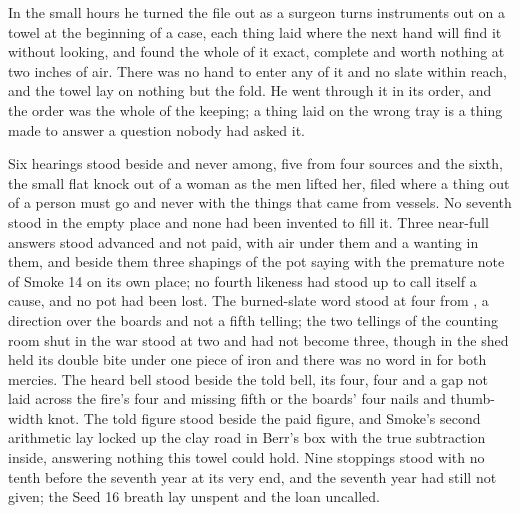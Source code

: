 \scenebreak

In the small hours he turned the file out as a surgeon turns instruments out on a towel at the beginning of a case, each thing laid where the next hand will find it without looking, and found the whole of it exact, complete and worth nothing at two inches of air. There was no hand to enter any of it and no slate within reach, and the towel lay on nothing but the fold. He went through it in its order, and the order was the whole of the keeping; a thing laid on the wrong tray is a thing made to answer a question nobody had asked it.

Six hearings stood beside and never among, five from four sources and the sixth, the small flat knock out of a woman as the men lifted her, filed where a thing out of a person must go and never with the things that came from vessels. No seventh stood in the empty place and none had been invented to fill it. Three near-full answers stood advanced and not paid, with air under them and a wanting in them, and beside them three shapings of the pot saying with the premature note of Smoke 14 on its own place; no fourth likeness had stood up to call itself a cause, and no pot had been lost. The burned-slate word stood at four from , a direction over the boards and not a fifth telling; the two tellings of the counting room shut in the war stood at two and had not become three, though  in the shed held its double bite under one piece of iron and there was no word in  for both mercies. The heard bell stood beside the told bell, its four, four and a gap not laid across the fire's four and missing fifth or the boards' four nails and thumb-width knot. The told figure stood beside the paid figure, and Smoke's second arithmetic lay locked up the clay road in Berr's box with the true subtraction inside, answering nothing this towel could hold. Nine stoppings stood with no tenth before the seventh year at its very end, and the seventh year had still not given; the Seed 16 breath lay unspent and the loan uncalled.

